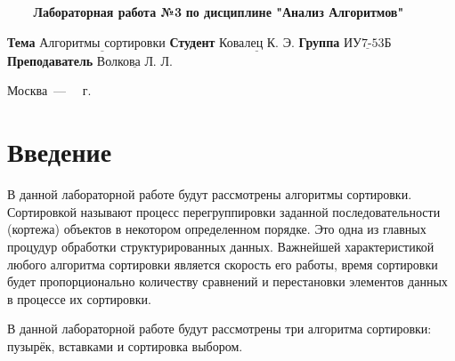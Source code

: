 \documentclass[a4paper,14pt, unknownkeysallowed]{extreport}
\begin{document}
\begin{titlepage}
	
	\begin{center}
		\noindent\begin{minipage}{1.3\textwidth}\centering
		\Large\textbf{   ~~~ Лабораторная работа №3}\newline
		\textbf{по дисциплине "Анализ Алгоритмов"}\newline\newline\newline
		\end{minipage}
	\end{center}
	
	\noindent\textbf{Тема} 			$\underline{\text{Алгоритмы сортировки}}$\newline\newline
	\noindent\textbf{Студент} 		$\underline{\text{Ковалец К. Э.}}$\newline\newline
	\noindent\textbf{Группа} 		$\underline{\text{ИУ7-53Б}}$\newline\newline
	\noindent\textbf{Преподаватель} $\underline{\text{Волкова Л. Л.}}$\newline
	
	\begin{center}
		\vfill
		Москва~---~\the\year
		~г.
	\end{center}
	\restoregeometry
\end{titlepage}



\renewcommand{\contentsname}{Содержание} 
\tableofcontents
\setcounter{page}{2}




\chapter*{Введение}

В данной лабораторной работе будут рассмотрены алгоритмы сортировки. Сортировкой называют процесс перегруппировки заданной последовательности (кортежа) объектов в некотором определенном порядке.
Это одна из главных процудур обработки структурированных данных. Важнейшей характеристикой любого алгоритма сортировки является скорость его работы, время сортировки будет пропорционально количеству сравнений и перестановки элементов данных в процессе их сортировки.

В данной лабораторной работе будут рассмотрены три алгоритма сортировки: пузырёк, вставка­ми и сортировка выбором. \newline
\end{document}
